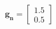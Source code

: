 \documentclass[preview]{standalone}
\begin{document}
\begin{align*}
\mathbf{g_n} = \begin{bmatrix} 1.5 \\ 0.5 \end{bmatrix}
\end{align*}
\end{document}
